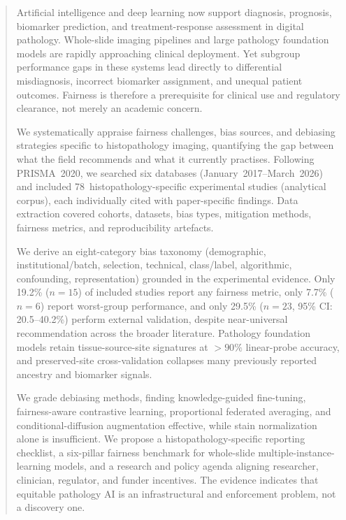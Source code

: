 
\begin{abstract}
Artificial intelligence and deep learning now support diagnosis, prognosis, biomarker prediction, and treatment-response assessment in digital pathology. Whole-slide imaging pipelines and large pathology foundation models are rapidly approaching clinical deployment. Yet subgroup performance gaps in these systems lead directly to differential misdiagnosis, incorrect biomarker assignment, and unequal patient outcomes. Fairness is therefore a prerequisite for clinical use and regulatory clearance, not merely an academic concern.

We systematically appraise fairness challenges, bias sources, and debiasing strategies specific to histopathology imaging, quantifying the gap between what the field recommends and what it currently practises. Following PRISMA~2020, we searched six databases (January~2017--March~2026) and included 78~histopathology-specific experimental studies (analytical corpus), each individually cited with paper-specific findings. Data extraction covered cohorts, datasets, bias types, mitigation methods, fairness metrics, and reproducibility artefacts.

We derive an eight-category bias taxonomy (demographic, institutional/batch, selection, technical, class/label, algorithmic, confounding, representation) grounded in the experimental evidence. Only 19.2\% ($n=15$) of included studies report any fairness metric, only 7.7\% ($n=6$) report worst-group performance, and only 29.5\% ($n=23$, 95\% CI: 20.5--40.2\%) perform external validation, despite near-universal recommendation across the broader literature. Pathology foundation models retain tissue-source-site signatures at ${>}90\%$ linear-probe accuracy, and preserved-site cross-validation collapses many previously reported ancestry and biomarker signals.

We grade debiasing methods, finding knowledge-guided fine-tuning, fairness-aware contrastive learning, proportional federated averaging, and conditional-diffusion augmentation effective, while stain normalization alone is insufficient. We propose a histopathology-specific reporting checklist, a six-pillar fairness benchmark for whole-slide multiple-instance-learning models, and a research and policy agenda aligning researcher, clinician, regulator, and funder incentives. The evidence indicates that equitable pathology AI is an infrastructural and enforcement problem, not a discovery one.
\end{abstract}
